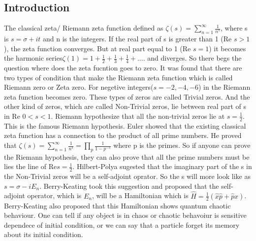 \documentclass[12pt, letterpaper]{article}
\newcommand*{\1}{\hspace{1pt}}
\begin{document}
    \newpage
    \begin{mdframed}[hidealllines=true,backgroundcolor=blue!20]
    \section{Introduction}
    The classical zeta/ Riemann zeta function defined as $\zeta(s) = \sum _{n=1}^{\infty} \frac{1}{n^{s}}$\cite{s3}, where s is $s=\sigma + it$ and n is the integers. If the real part of s is greater
    than 1 (Re $s > 1$), the zeta function converges. But at real part equal to 1 (Re $s = 1$) it becomes the harmonic series$\zeta(1) = 1 + \frac{1}{2} + \frac{1}{3} + 
    \frac{1}{4} + ....$ and diverges. So there begs the question where does the zeta fucntion goes to zero. It was found that there are two types of condition that make 
    the Riemann zeta function which is called Riemann zero or Zeta zero. For negetive integers($s=-2,-4,-6$) in the Riemann zeta function becomes zero. These types of zeros are called
    Trivial zeros. And the other kind of zeros, which are called Non-Trivial zeros, lie between real part of s in Re $0<s<1$. Riemann hypothesize that all the non-trivial zeros
    lie at $s=\frac{1}{2}$. This is the famous Riemann hypothesis. Euler showed that the existing classical zeta function has a connection to the product of all prime numbers.
    He proved that $\zeta(s) = \sum_{n=1}^{\infty} \frac{1}{n^{s}} = \prod _{p} \frac{1}{1-p^{-s}}$ where p is the primes. So if anyone can prove the Riemann hypothesis, they
    can also prove that all the prime numbers must be lies the line of Re$ s = \frac{1}{2}$. Hilbert-P$\acute{o}$lya sugested that the imaginary part of the s in the Non-Trivial
    zeros will be a self-adjoint oprator. So the s will more look like as $s=\sigma - iE_{n}$. Berry-Keating took this suggestion and proposed that the self-adjoint operator, which 
    is $E_{n}$, will be a Hamiltonian which is $\hat{H} = \frac{1}{2}(\hat{x}\hat{p} + \hat{p}\hat{x})$. Berry-Keating also proposed that this Hamiltonian shows quantum chaotic behaviour.
    One can tell if any object is in chaos or chaotic behavoiur is sensitive dependece of initial condition, or we can say that a particle forget its memory about its initial condition.
    

\end{mdframed}
\end{document}
